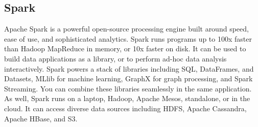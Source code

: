 \documentclass[12pt,twoside]{article}
\begin{document}
\subsection{Spark}
Apache Spark is a powerful open-source processing engine built around speed, ease of use, and sophisticated analytics. Spark runs programs up to 100x faster than Hadoop MapReduce in memory, or 10x faster on disk. It can be used to build data applications as a library, or to perform ad-hoc data analysis interactively. Spark powers a stack of libraries including SQL, DataFrames, and Datasets, MLlib for machine learning, GraphX for graph processing, and Spark Streaming. You can combine these libraries seamlessly in the same application. As well, Spark runs on a laptop, Hadoop, Apache Mesos, standalone, or in the cloud. It can access diverse data sources including HDFS, Apache Cassandra, Apache HBase, and S3.



\newpage
{}
\setcounter{page}{1}
\end{document}
